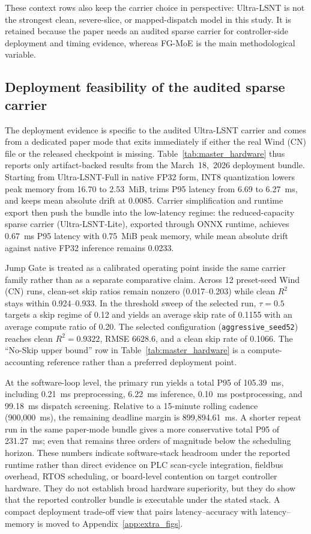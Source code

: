 \documentclass[review,1p,times]{elsarticle}
\begin{document}
These context rows also keep the carrier choice in perspective: Ultra-LSNT is not the strongest clean, severe-slice, or mapped-dispatch model in this study. It is retained because the paper needs an audited sparse carrier for controller-side deployment and timing evidence, whereas FG-MoE is the main methodological variable.

\subsection{Deployment feasibility of the audited sparse carrier}
\label{subsec:results_efficiency}
The deployment evidence is specific to the audited Ultra-LSNT carrier and comes from a dedicated paper mode that exits immediately if either the real Wind (CN) file or the released checkpoint is missing. Table~\ref{tab:master_hardware} thus reports only artifact-backed results from the March~18,~2026 deployment bundle. Starting from Ultra-LSNT-Full in native FP32 form, INT8 quantization lowers peak memory from 16.70 to 2.53~MiB, trims P95 latency from 6.69 to 6.27~ms, and keeps mean absolute drift at 0.0085. Carrier simplification and runtime export then push the bundle into the low-latency regime: the reduced-capacity sparse carrier (Ultra-LSNT-Lite), exported through ONNX runtime, achieves 0.67~ms P95 latency with 0.75~MiB peak memory, while mean absolute drift against native FP32 inference remains 0.0233.

Jump Gate is treated as a calibrated operating point inside the same carrier family rather than as a separate comparative claim. Across 12 preset-seed Wind (CN) runs, clean-set skip ratios remain nonzero (0.017--0.203) while clean $R^2$ stays within 0.924--0.933. In the threshold sweep of the selected run, $\tau=0.5$ targets a skip regime of 0.12 and yields an average skip rate of 0.1155 with an average compute ratio of 0.20. The selected configuration (\texttt{aggressive\_seed52}) reaches clean $R^2=0.9322$, RMSE $6628.6$, and a clean skip rate of 0.1066. The ``No-Skip upper bound'' row in Table~\ref{tab:master_hardware} is a compute-accounting reference rather than a preferred deployment point.

At the software-loop level, the primary run yields a total P95 of 105.39~ms, including 0.21~ms preprocessing, 6.22~ms inference, 0.10~ms postprocessing, and 99.18~ms dispatch screening. Relative to a 15-minute rolling cadence (900{,}000~ms), the remaining deadline margin is 899{,}894.61~ms. A shorter repeat run in the same paper-mode bundle gives a more conservative total P95 of 231.27~ms; even that remains three orders of magnitude below the scheduling horizon. These numbers indicate software-stack headroom under the reported runtime rather than direct evidence on PLC scan-cycle integration, fieldbus overhead, RTOS scheduling, or board-level contention on target controller hardware. They do not establish broad hardware superiority, but they do show that the reported controller bundle is executable under the stated stack. A compact deployment trade-off view that pairs latency--accuracy with latency--memory is moved to Appendix~\ref{app:extra_figs}.
\end{document}
